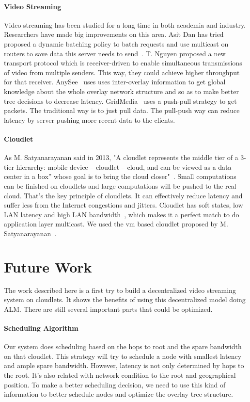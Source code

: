 \documentclass[letterpaper,twocolumn,10pt]{article}
\begin{document}
\paragraph{Video Streaming}
Video streaming has been studied for a long time in both academia and industry. Researchers have made big improvements on this area. Asit Dan has tried proposed a dynamic batching policy to batch requests and use multicast on routers to save data this server needs to send~\cite{dan1996dynamic, dan1994scheduling}. T. Nguyen proposed a new transport protocol which is receiver-driven to enable simultaneous transmissions of video from multiple senders. This way, they could achieve higher throughput for that receiver. AnySee~\cite{liao2006anysee} uses uses inter-overlay information to get global knowledge about the whole overlay network structure and so as to make better tree decisions to decrease latency. GridMedia~\cite{zhang2005large} uses a push-pull strategy to get packets. The traditional way is to just pull data. The pull-push way can reduce latency by server pushing more recent data to the clients.

\paragraph{Cloudlet}As M. Satyanarayanan said in 2013, "A cloudlet represents the middle tier of a 3-tier hierarchy: mobile device – cloudlet – cloud, and can be viewed as a data center in a box” whose goal is to bring the cloud closer"~\cite{satyanarayanan2013cloudlets}. Small computations can be finished on cloudlets and large computations will be pushed to the real cloud. That's the key principle of cloudlets. It can effectively reduce latency and suffer less from the Internet congestions and jitters. Cloudlet has soft states, low LAN latency and high LAN bandwidth~\cite{satyanarayanan2011mobile}, which makes it a perfect match to do application layer multicast. We used the vm based cloudlet proposed by M. Satyanarayanan~\cite{satyanarayanan2009case}.

\section{Future Work}
The work described here is a first try to build a decentralized video streaming system on cloudlets. It shows the benefits of using this decentralized model doing ALM. There are still several important parts that could be optimized.

\paragraph{Scheduling Algorithm}
Our system does scheduling based on the hops to root and the spare bandwidth on that cloudlet. This strategy will try to schedule a node with smallest latency and ample spare bandwidth. However, latency is not only determined by hops to the root. It's also related with network condition to the root and geographical position. To make a better scheduling decision, we need to use this kind of information to better schedule nodes and optimize the overlay tree structure.
\end{document}
